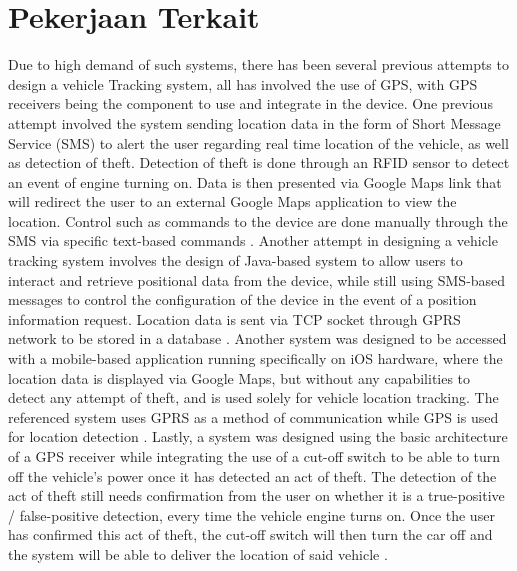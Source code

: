 \documentclass[conference]{IEEEtran}
\begin{document}
\section{Pekerjaan Terkait}
Due to high demand of such systems, there has been several previous attempts to design a vehicle Tracking system, all has involved the use of GPS, with GPS receivers being the component to use and integrate in the device. One previous attempt involved the system sending location data in the form of Short Message Service (SMS) to alert the user regarding real time location of the vehicle, as well as detection of theft. Detection of theft is done through an RFID sensor to detect an event of engine turning on. Data is then presented via Google Maps link that will redirect the user to an external Google Maps application to view the location. Control such as commands to the device are done manually through the SMS via specific text-based commands \cite{iotmounika}. Another attempt in designing a vehicle tracking system involves the design of Java-based system to allow users to interact and retrieve positional data from the device, while still using SMS-based messages to control the 
configuration of the device in the event of a position information request. Location data is sent via TCP socket through GPRS network to be stored in a database \cite{6132526}. Another system was designed to be accessed with a mobile-based application running specifically on iOS hardware, where the location data is displayed via Google Maps, but without any capabilities to detect any attempt of theft, and is used solely for vehicle location tracking. The referenced system uses GPRS as a method of communication while GPS is used for location detection \cite{6803187}.
Lastly, a system was designed using the basic architecture of a GPS receiver while integrating the use of a cut-off switch to be able to turn off the vehicle's power once it has detected an act of theft. The detection of the act of theft still needs confirmation from the user on whether it is a true-positive / false-positive detection, every time the vehicle engine turns on. Once the user has confirmed this act of theft, the cut-off switch will then turn the car off and the system will be able to deliver the location of said vehicle \cite{article1}. 
\end{document}
